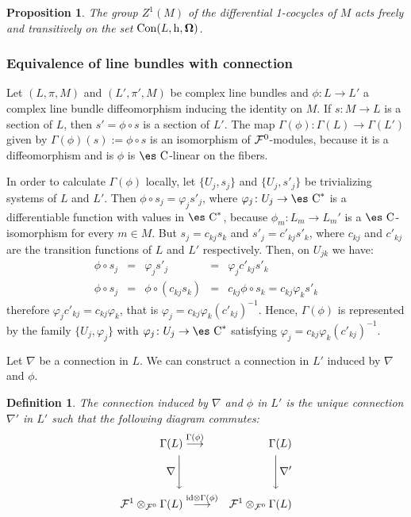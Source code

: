 \documentclass[12pt]{article}
\theoremstyle{plain}
\newtheorem{prop}{Proposition}
\newtheorem{definition}{Definition}
\def\beann{\begin{eqnarray*}}
\def\eeann{\end{eqnarray*}}
\def\mapping#1{\mathrel{\mathop{\longrightarrow}\limits^{#1}}}
\def\h{{\rm h}}
\def\curv{{\bf \Omega}}
\def\Complex{\mbox{\es C}}
\begin{document}
\begin{prop}
The group $Z^1(M)$ of the differential 1-cocycles of $M$
acts freely and transitively on the set
${\rm Con}(L,\h ,\curv )$.
\end{prop}


\subsubsection{Equivalence of line bundles with connection}


Let $(L,\pi ,M)$ and $(L',\pi',M)$ be complex line bundles and
$\phi \colon L \to L'$ a complex line bundle diffeomorphism
inducing the identity on $M$.
If $s \colon M \to L$ is a section of $L$,
then $s' = \phi \circ s$ is a section of $L'$.
The map $\Gamma (\phi) \colon \Gamma (L) \to \Gamma (L')$
given by $\Gamma (\phi)(s) := \phi \circ s$
is an isomorphism of ${\cal F}^0$-modules,
because it is a diffeomorphism and is
$\phi$ is $\Complex$-linear on the fibers.

In order to calculate $\Gamma (\phi)$ locally,
let $\{ U_j,s_j \}$ and $\{ U_j,s'_j \}$ be
trivializing systems of $L$ and $L'$.
Then $\phi \circ s_j = \varphi_j s'_j$,
where $\varphi_j \colon U_j \to \Complex^*$
is a differentiable function with values in
$\Complex^*$, because
$\phi_m \colon L_m \to L_m'$
is a $\Complex$-isomorphism for every $m \in M$.
But $s_j = c_{kj}s_k$
and $s'_j = c'_{kj}s'_k$,
where $c_{kj}$ and $c'_{kj}$
are the transition functions of $L$ and $L'$ respectively.
Then, on $U_{jk}$ we have:
$$
\begin{array}{ccccc}
\phi \circ s_j &=& \varphi_j s'_j &=&
\varphi_j c'_{kj}s'_k
\\
\phi \circ s_j &=& \phi \circ (c_{kj}s_k) &=&
c_{kj}\phi \circ s_k = c_{kj}\varphi_k s'_k
\end{array}
$$
therefore $\varphi_j c'_{kj} = c_{kj} \varphi_k$,
that is $\varphi_j = c_{kj} \varphi_k (c'_{kj})^{-1}$.
Hence, $\Gamma (\phi)$ is represented by the family
$\{ U_j,\varphi_j \}$
with $\varphi_j \colon U_j \to \Complex^*$
satisfying
$\varphi_j = c_{kj} \varphi_k (c'_{kj})^{-1}$.

Let $\nabla$ be a connection in $L$.
We can construct a connection in $L'$ induced by $\nabla$ and $\phi$.

\begin{definition}
The {\rm connection induced} by $\nabla$ and $\phi$ in $L'$ is the
unique connection $\nabla '$ in $L'$
such that the following diagram commutes:
\beann
\Gamma (L) &\mapping{\Gamma (\phi)} & \Gamma (L)
\\
\nabla \Bigg\downarrow & & \Bigg\downarrow \nabla '
\\
{\cal F}^1 \otimes_{{\cal F}^0} \Gamma (L)
&\mapping{{\rm id} \otimes \Gamma (\phi)} &
{\cal F}^1 \otimes_{{\cal F}^0} \Gamma (L)
\eeann
\end{definition}
\end{document}
